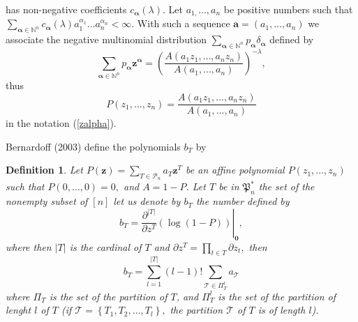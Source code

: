 \documentclass[a4paper,oneside,notitlepage]{article}%
\newtheorem{definition}[theorem]{Definition}
\begin{document}
has non-negative coefficients $c_{\mathbf{\boldsymbol{\alpha}}}\left(
\lambda\right)  .$ Let $a_{1,}\ldots,a_{n}$ be positive numbers such that
$\sum_{\mathbf{\boldsymbol{\alpha}}\in\mathbb{N}^{n}}%
c_{\mathbf{\boldsymbol{\alpha}}}\left(  \lambda\right)  a_{1}^{\alpha_{1}%
}\ldots a_{n}^{\alpha_{n}}<\infty.$ With such a sequence $\mathbf{a}=\left(
a_{1},\ldots,a_{n}\right)  $ we associate the negative multinomial
distribution $\sum\limits_{\mathbf{\boldsymbol{\alpha}}\in\mathbb{N}^{n}%
}p_{\mathbf{\boldsymbol{\alpha}}}\delta_{\mathbf{\boldsymbol{\alpha}}}$
defined by
\begin{equation}
\sum\limits_{\mathbf{\boldsymbol{\alpha}}\in\mathbb{N}^{n}}%
p_{\mathbf{\boldsymbol{\alpha}}}\mathbf{z}^{\mathbf{\boldsymbol{\alpha}}%
}=\left(  \dfrac{A\left(  a_{1}z_{1},\ldots,a_{n}z_{n}\right)  }{A\left(
a_{1},\ldots,a_{n}\right)  }\right)  ^{-\lambda}, \label{P-lambda}%
\end{equation}
thus%
\begin{equation}
P\left(  z_{1},\ldots,z_{n}\right)  =\frac{A\left(  a_{1}z_{1},\ldots
,a_{n}z_{n}\right)  }{A\left(  a_{1},\ldots,a_{n}\right)  } \label{Pofzalpha}%
\end{equation}
in the notation (\ref{zalpha}).

Bernardoff (2003) define the polynomials $b_{T}$ by

\begin{definition}
Let $P\left(  \mathbf{z}\right)  =\sum\limits_{T\in\mathcal{P}_{n}}%
a_{T}\mathbf{z}^{T}$ be an affine polynomial $P\left(  z_{1},\ldots
,z_{n}\right)  $ such that $P\left(  0,\ldots,0\right)  =0,$ and $A=1-P$. Let
$T$ be in $\mathfrak{P}_{n}^{\ast}$ the set of the nonempty subset of $\left[
n\right]  $ let us denote by $b_{T}$ the number defined by
\[
b_{T}=\left.  \frac{\partial^{\left\vert T\right\vert }}{\partial z^{T}%
}\left(  \log\left(  1-P\right)  \right)  \right\vert _{\mathbf{0}},
\]
where then $\left\vert T\right\vert $ is the cardinal of $T$ and $\partial
z^{T}=\prod_{t\in T}\partial z_{t},$ then
\begin{equation}
b_{T}=\sum\limits_{l=1}^{\left\vert T\right\vert }\left(  l-1\right)
!\sum\limits_{\mathcal{T}\in\Pi_{T}^{l}}a_{\mathcal{T}} \label{bT}%
\end{equation}
where $\Pi_{T}$ is the set of the partition of $T$, and $\Pi_{T}^{l}$ is the
set of the partition of lenght $l$ of $T$ (if $\mathcal{T}=\left\{
T_{1},T_{2},\ldots,T_{l}\right\}  ,$ the partition $\mathcal{T}$ of $T$ is of
length $l$).
\end{definition}
\end{document}
